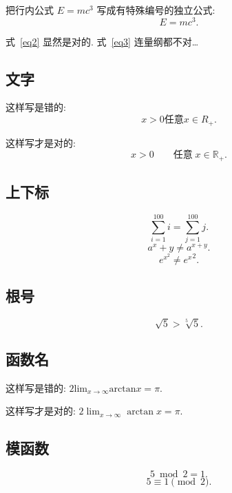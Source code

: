 \documentclass{ctexart}
\begin{document}
    把行内公式 $E=mc^3$ 写成有特殊编号的独立公式:
    \begin{equation}
        E=mc^3. \tag{$\ast$} \label{eq3}
    \end{equation}

    式~\eqref{eq2} 显然是对的. 式~\eqref{eq3} 连量纲都不对\dots{}
    \subsection{文字}
    这样写是错的:
    \begin{equation*}
        x > 0    任意 x \in R_+.
    \end{equation*}

    这样写才是对的:
    \begin{equation*}
        x > 0 \qquad \text{任意} \; x \in \mathbb{R_+}.
    \end{equation*}
    \subsection{上下标}
    \begin{equation*}
        \sum_{i=1}^{100} i = \sum^{100}_{j=1} j.
    \end{equation*}
    \begin{equation*}
        a^x+y \neq a^{x+y}.
    \end{equation*}
    \begin{equation*}
        e^{x^2} \neq {e^x}^2.
    \end{equation*}
    \subsection{根号}
    \begin{equation*}
        \sqrt{5} > \sqrt[5]{5}.
    \end{equation*}
    \subsection{函数名}
    这样写是错的:
    $ 2 \text{lim}_{x \rightarrow \infty} \text{arctan} x = \pi $.

    这样写才是对的:
    $ 2 \lim_{x \rightarrow \infty} \arctan x = \pi $.
    \subsection{模函数}
    \begin{equation*}
        5 \bmod 2 = 1.
    \end{equation*}
    \begin{equation*}
        5 \equiv 1 \pmod{2}.
    \end{equation*}
\end{document}
